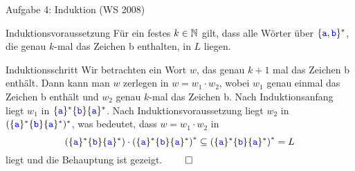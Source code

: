 \begin{frame}{Aufgabe 4: Induktion (WS 2008)}
	\begin{block}{Induktionsvoraussetzung}  \pause
		Für ein festes $k \in \mathbb{N}$ gilt, dass alle Wörter über $\{\hbox{\textcolor{blue}{\texttt{a}}}, \hbox{\textcolor{blue}{\texttt{b}}}\}^\ast$, die genau $k$-mal das Zeichen \word b enthalten, in $L$ liegen.
	\end{block} \pause
	\begin{block}{Induktionsschritt}  \pause
		Wir betrachten ein Wort $w$, das genau $k + 1$ mal das Zeichen \word b enthält. Dann kann man $w$ zerlegen in $w = w_1 \cdot w_2$, wobei $w_1$ genau einmal das Zeichen \word b enthält und $w_2$ genau $k$-mal das Zeichen \word b. \pause Nach Induktionsanfang liegt $w_1$ in $\{\hbox{\textcolor{blue}{\texttt{a}}}\}^\ast \{\hbox{\textcolor{blue}{\texttt{b}}}\}\{\hbox{\textcolor{blue}{\texttt{a}}}\}^\ast$. Nach Induktionsvoraussetzung liegt $w_2$ in $(\{\hbox{\textcolor{blue}{\texttt{a}}}\}^\ast \{\hbox{\textcolor{blue}{\texttt{b}}}\}\{\hbox{\textcolor{blue}{\texttt{a}}}\}^\ast )^\ast$, was bedeutet, dass $w = w_1 \cdot w_2$ in $$\left(\{\hbox{\textcolor{blue}{\texttt{a}}}\}^\ast \{\hbox{\textcolor{blue}{\texttt{b}}}\}\{\hbox{\textcolor{blue}{\texttt{a}}}\}^\ast \right) \cdot \left(\{\hbox{\textcolor{blue}{\texttt{a}}}\}^\ast \{\hbox{\textcolor{blue}{\texttt{b}}}\}\{\hbox{\textcolor{blue}{\texttt{a}}}\}^\ast \right)^\ast \subseteq \left(\{\hbox{\textcolor{blue}{\texttt{a}}}\}^\ast \{\hbox{\textcolor{blue}{\texttt{b}}}\}\{\hbox{\textcolor{blue}{\texttt{a}}}\}^\ast \right)^\ast = L$$ liegt und die Behauptung ist gezeigt. $\qed$
	\end{block}
\end{frame}


%

%

%



